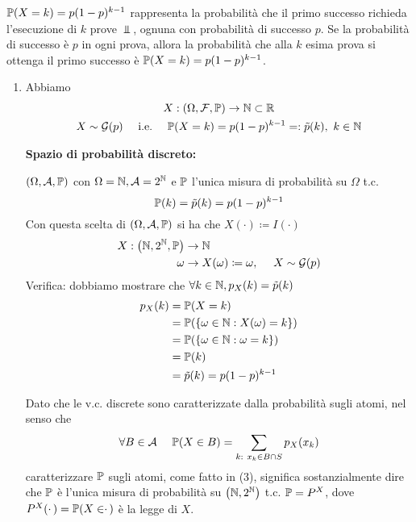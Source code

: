 \begin{oss}
$\mathbb{P}(X=k) =p(1-p)^{k-1}$ rappresenta la probabilità che il primo successo richieda l'esecuzione di $k$ prove $\Bot $, ognuna con probabilità di successo $p$. Se la probabilità di successo è $p$ in ogni prova, allora la probabilità che alla $k$ esima prova si ottenga il primo successo è $\mathbb{P}(X=k) =p(1-p)^{k-1}$.
\end{oss}
\begin{enumerate}
\item Abbiamo
\begin{gather*}
X:(\Omega ,\mathcal{F} ,\mathbb{P})\rightarrow \mathbb{N} \subset \mathbb{R}\\
X\sim \mathcal{G}(p) \ \ \ \ \text{i.e.} \ \ \ \ \mathbb{P}(X=k) =p(1-p)^{k-1} =:\tilde{p}(k) ,\ k\in \mathbb{N}
\end{gather*}

\textbf{Spazio di probabilità discreto:}

$(\Omega,\mathcal{A},\mathbb{P})$ con $\Omega =\mathbb{N} ,\mathcal{A} =2^{\mathbb{N}}$ e $\mathbb{P}$ l'unica misura di probabilità su $\Omega $ t.c.
\begin{equation}
\mathbb{P}(k) =\tilde{p}(k) =p(1-p)^{k-1}
\end{equation}
Con questa scelta di $(\Omega,\mathcal{A},\mathbb{P})$ si ha che $X(\cdotp) \coloneqq I(\cdotp)$
\begin{align*}
X:\left(\mathbb{N} ,2^{\mathbb{N}} ,\mathbb{P}\right) & \rightarrow \mathbb{N}\\
\omega  & \rightarrow X(\omega) \coloneqq \omega ,\ \ \ \ X\sim \mathcal{G}(p)
\end{align*}
Verifica: dobbiamo mostrare che $\forall k\in \mathbb{N} ,p_{X}(k) =\tilde{p}(k)$
\begin{align*}
p_{X}(k) & =\mathbb{P}(X=k)\\
 & =\mathbb{P}(\{\omega \in \mathbb{N} :X(\omega) =k\})\\
 & =\mathbb{P}(\{\omega \in \mathbb{N} :\omega =k\})\\
 & =\mathbb{P}(k)\\
 & =\tilde{p}(k) =p(1-p)^{k-1}
\end{align*}

\begin{oss}
Dato che le v.c. discrete sono caratterizzate dalla probabilità sugli atomi, nel senso che
\begin{equation*}
\forall B\in \Ac \ \ \ \ \PP(X\in B) =\sum\limits_{k:\ x_{k} \in B\cap S} p_{X}(x_{k})
\end{equation*}
caratterizzare $\mathbb{P}$ sugli atomi, come fatto in (3), significa sostanzialmente dire che $\mathbb{P}$ è l'unica misura di probabilità su $\left(\mathbb{N} ,2^{\mathbb{N}}\right)$ t.c. $\mathbb{P} =P^{X}$, dove $P^{X}(\cdotp) =\mathbb{P}(X\in \cdotp)$ è la legge di $X$.


\end{oss}
\end{enumerate}
